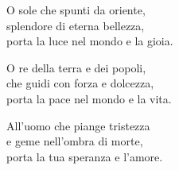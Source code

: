 

\spazio

\strofa O sole che spunti da oriente,\\
splendore di eterna bellezza,\\
porta la luce nel mondo e la gioia.

\spazio


\spazio

\strofa O re della terra e dei popoli,\\
che guidi con forza e dolcezza,\\
porta la pace nel mondo e la vita.

\spazio


\spazio

\strofa All'uomo che piange tristezza\\
e geme nell'ombra di morte,\\
porta la tua speranza e l'amore.

\spazio

